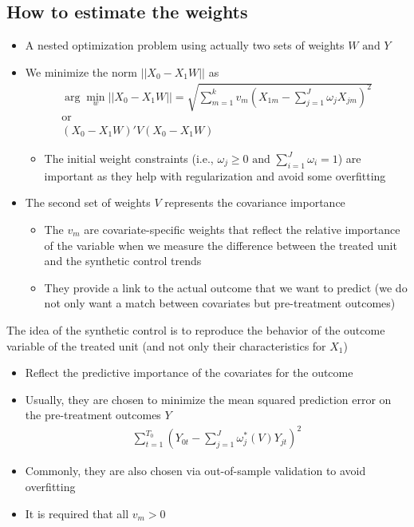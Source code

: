 \documentclass[10pt]{article}
\begin{document}
\subsection{How to estimate the weights}
\begin{itemize}
    \item A nested optimization problem using actually two sets of weights $ W \text{ and } Y $
    \item We minimize the norm $||X_0 - X_1W|| $ as 
    \begin{gather*}
        \arg\min_w ||X_0 - X_1W|| = \sqrt{\sum_{m = 1}^{k}v_m\left(X_{1m} - \sum_{j = 1}^{J}\omega_jX_{jm}\right)^2}\\
        \text{or}\\
        \left(X_0 - X_1W\right)'V\left(X_0 - X_1W\right)
    \end{gather*}
    \begin{itemize}
        \item The initial weight constraints (i.e., $\omega_j \ge 0 \text{ and } \sum_{i = 1}^{J}\omega_i = 1 $) are important as they help with regularization and avoid some overfitting 
    \end{itemize}
    \item The second set of weights $V $ represents the covariance importance 
    \begin{itemize}
        \item The $v_m $ are covariate-specific weights that reflect the relative importance of the variable when we measure the difference between the treated unit and the synthetic control trends 
        \item They provide a link to the actual outcome that we want to predict (we do not only want a match between covariates but pre-treatment outcomes)
    \end{itemize}
\end{itemize}
The idea of the synthetic control is to reproduce the behavior of the outcome variable of the treated unit (and not only their characteristics for $X_1 $)
\begin{itemize}
    \item Reflect the predictive importance of the covariates for the outcome 
    \item Usually, they are chosen to minimize the mean squared prediction error on the pre-treatment outcomes $Y $
    \begin{gather*}
        \sum_{t = 1}^{T_0}\left(Y_{0t} - \sum_{j = 1}^{J}\omega_j^*(V)Y_{jt}\right)^2
    \end{gather*}
    \item Commonly, they are also chosen via out-of-sample validation to avoid overfitting
    \item It is required that all $v_m > 0 $
\end{itemize}
\newpage 
\end{document}
